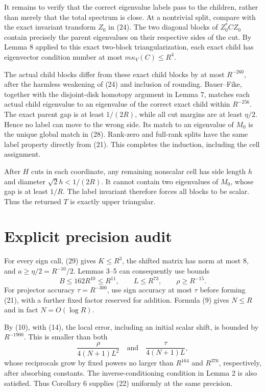 \documentclass[10pt,a4paper]{article}
\begin{document}
It remains to verify that the correct eigenvalue labels pass to the
children, rather than merely that the total spectrum is close. At a
nontrivial split, compare with the exact invariant transform \(Z_0\) in
(24). The two diagonal blocks of \(Z_0^*CZ_0\) contain precisely the
parent eigenvalues on their respective sides of the cut. By Lemma 8
applied to this exact two-block triangularization, each exact child has
eigenvector condition number at most \(m\kappa_V(C)\le R^4\).

The actual child blocks differ from these exact child blocks by at most
\(R^{-260}\), after the harmless weakening of (24) and inclusion of
rounding. Bauer--Fike, together with the disjoint-disk homotopy argument
in Lemma 7, matches each actual child eigenvalue to an eigenvalue of the
correct exact child within \(R^{-256}\). The exact parent gap is at
least \(1/(2R)\), while all cut margins are at least \(\eta/2\). Hence
no label can move to the wrong side. Its match to an eigenvalue of
\(M_0\) is the unique global match in (28). Rank-zero and full-rank
splits have the same label property directly from (21). This completes
the induction, including the cell assignment.

After \(H\) cuts in each coordinate, any remaining nonscalar cell has
side length \(h\) and diameter \(\sqrt2h<1/(2R)\). It cannot contain two
eigenvalues of \(M_0\), whose gap is at least \(1/R\). The label
invariant therefore forces all blocks to be scalar. Thus the returned
\(T\) is exactly upper triangular.

\section{Explicit precision audit}\label{explicit-precision-audit}

For every sign call, (29) gives \(K\le R^3\), the shifted matrix has
norm at most \(8\), and \(a\ge\eta/2=R^{-10}/2\). Lemmas 3--5 can
consequently use bounds \[
 B\le162R^{10}\le R^{11},\qquad
 L\le R^{73},\qquad
 \rho\ge R^{-15}.
 \tag{31}
\] For projector accuracy \(\tau=R^{-300}\), use sign accuracy at most
\(\tau\) before forming (21), with a further fixed factor reserved for
addition. Formula (9) gives \(N\le R\) and in fact \(N=O(\log R)\).

By (10), with (14), the local error, including an initial scalar shift,
is bounded by \(R^{-1900}\). This is smaller than both \[
 \frac{\rho}{4(N+1)L^2}
 \quad\text{and}\quad
 \frac{\tau}{4(N+1)L},
\] whose reciprocals grow by fixed powers no larger than \(R^{164}\) and
\(R^{376}\), respectively, after absorbing constants. The
inverse-conditioning condition in Lemma 2 is also satisfied. Thus
Corollary 6 supplies (22) uniformly at the same precision.
\end{document}

